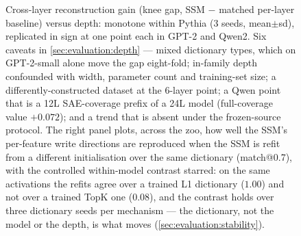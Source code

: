 \begin{figure}[t]
  \centering
  
  \caption{Cross-layer reconstruction gain (knee gap, SSM $-$ matched
  per-layer baseline) versus depth: monotone within Pythia (3 seeds,
  mean$\pm$sd), replicated in sign at one point each in GPT-2 and Qwen2. Six
  caveats in \cref{sec:evaluation:depth} --- mixed dictionary types, which on
  GPT-2-small alone move the gap eight-fold; in-family
  depth confounded with width, parameter count and training-set size; a
  differently-constructed dataset at the 6-layer point; a Qwen point that
  is a 12L SAE-coverage prefix of a 24L model (full-coverage value $+0.072$);
  and a trend that is absent under the frozen-source protocol.
  The right panel plots, across the zoo, how well the SSM's per-feature write
  directions are reproduced when the SSM is refit from a different
  initialisation over the same dictionary (match@0.7), with the controlled
  within-model contrast
  starred: on the same \pythia{} activations the refits agree over a trained
  L1 dictionary ($1.00$) and not over a trained TopK one ($0.08$), and the
  contrast holds over three dictionary seeds per mechanism --- the
  dictionary, not the model or the depth, is what moves
  (\cref{sec:evaluation:stability}).}
  \label{fig:depthscaling}
\end{figure}

